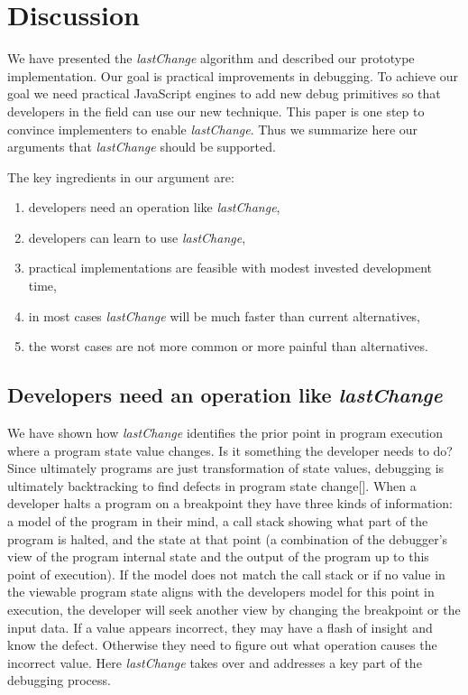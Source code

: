 \documentclass[runningheads,a4paper]{llncs}
\begin{document}
\section{Discussion}

We have presented the \textit{lastChange} algorithm and described our
prototype implementation. Our goal is practical improvements in debugging. To achieve our goal we need practical JavaScript engines
to add new debug primitives so that developers in the field can use our new technique. This paper is
one step to convince implementers to enable \textit{lastChange}.
Thus we summarize here our arguments that \textit{lastChange} should be supported.

The key ingredients in our argument are: 
\begin{enumerate}
   \item developers need an operation like \textit{lastChange}, 
   \item developers can learn to use \textit{lastChange}, 
   \item practical implementations are feasible with modest
invested development time,
   \item in most cases \textit{lastChange} will be much faster than current alternatives,
   \item the worst cases are not more common or more painful than
alternatives.
\end{enumerate}

\subsection{Developers need an operation like \protect\textit{lastChange} }

We have shown how \textit{lastChange} identifies the prior point in
program execution where a program state value changes. Is it something
the developer needs to do?  Since ultimately programs are just
transformation of state values, debugging is ultimately backtracking
to find defects in program state change[].  When a developer halts a
program on a breakpoint they have three kinds of information: a model
of the program in their mind, a call stack showing what part of the
program is halted, and the state at that point (a combination of the
debugger's view of the program internal state and the output of the
program up to this point of execution). If the model does not match
the call stack or if no value in the viewable program state aligns
with the developers model for this point in execution, the developer
will seek another view by changing the breakpoint or the input
data. If a value appears incorrect, they may have a flash of insight
and know the defect. Otherwise they need to figure out what operation
causes the incorrect value. Here \textit{lastChange} takes over and addresses a key
part of the debugging process.
\end{document}
